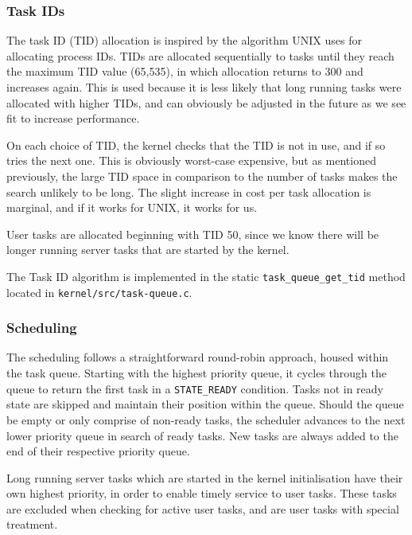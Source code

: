 \documentclass[12pt, titlepage]{article}
\begin{document}
    \subsubsection{Task IDs}
    \label{sec:tids}

    The task ID (TID) allocation is inspired by the algorithm UNIX uses for allocating process IDs. TIDs are allocated sequentially to tasks until they reach the maximum TID value (65,535), in which allocation returns to 300 and increases again. This is used because it is less likely that long running tasks were allocated with higher TIDs, and can obviously be adjusted in the future as we see fit to increase performance.

    On each choice of TID, the kernel checks that the TID is not in use, and if so tries the next one. This is obviously worst-case expensive, but as mentioned previously, the large TID space in comparison to the number of tasks makes the search unlikely to be long. The slight increase in cost per task allocation is marginal, and if it works for UNIX, it works for us.

    User tasks are allocated beginning with TID 50, since we know there will be longer running server tasks that are started by the kernel.

    The Task ID algorithm is implemented in the static \verb`task_queue_get_tid` method located in \verb`kernel/src/task-queue.c`.

    \subsubsection{Scheduling}
    \label{sec:scheduling}

    The scheduling follows a straightforward round-robin approach, housed within the task queue.
    Starting with the highest priority queue, it cycles through the queue to return the first task in a \verb`STATE_READY` condition.
    Tasks not in ready state are skipped and maintain their position within the queue.
    Should the queue be empty or only comprise of non-ready tasks, the scheduler advances to the next lower priority queue in search of ready tasks.
    New tasks are always added to the end of their respective priority queue.

    Long running server tasks which are started in the kernel initialisation have their own highest priority, in order to enable timely service to user tasks. These tasks are excluded when checking for active user tasks, and are user tasks with special treatment.
\end{document}
